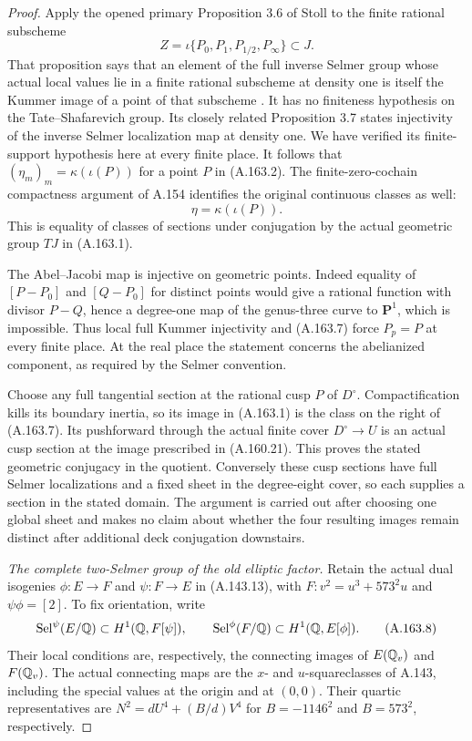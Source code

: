 \begin{proof}
Apply the opened primary Proposition 3.6 of Stoll
to the finite rational subscheme
\[
                  Z=\iota\{P_0,P_1,P_{1/2},P_\infty\}
                         \subset J.
\tag{A.163.6}
\]
That proposition says that an element of the full
inverse Selmer group whose actual local values lie
in a finite rational subscheme at density one is
itself the Kummer image of a point of that subscheme
\cite[Proposition 3.6, p.~9 of the author version]{LegStoll2007}.
It has no finiteness hypothesis on the Tate--Shafarevich
group.  Its closely related Proposition 3.7 states
injectivity of the inverse Selmer localization map
at density one.  We have verified its finite-support
hypothesis here at every finite place.  It follows
that \((\eta_m)_m=\kappa(\iota(P))\) for a point
\(P\) in (A.163.2).  The finite-zero-cochain
compactness argument of A.154 identifies the original
continuous classes as well:
\[
                              \eta=\kappa(\iota(P)).
\tag{A.163.7}
\]
This is equality of classes of sections under
conjugation by the actual geometric group \(TJ\)
in (A.163.1).

The Abel--Jacobi map is injective on geometric
points.  Indeed equality of \([P-P_0]\) and
\([Q-P_0]\) for distinct points would give a
rational function with divisor \(P-Q\), hence a
degree-one map of the genus-three curve to
\(\mathbf P^1\), which is impossible.  Thus local
full Kummer injectivity and (A.163.7) force
\(P_p=P\) at every finite place.  At the real place
the statement concerns the abelianized component,
as required by the Selmer convention.

Choose any full tangential section at the rational
cusp \(P\) of \(D^\circ\).  Compactification
kills its boundary inertia, so its image in
(A.163.1) is the class on the right of (A.163.7).
Its pushforward through the actual finite cover
\(D^\circ\to U\) is an actual cusp section at
the image prescribed in (A.160.21).  This proves
the stated geometric conjugacy in the quotient.
Conversely these cusp sections have full Selmer
localizations and a fixed sheet in the degree-eight
cover, so each supplies a section in the stated
domain.  The argument is carried out after choosing
one global sheet and makes no claim about whether
the four resulting images remain distinct after
additional deck conjugation downstairs.

\emph{The complete two-Selmer group of the old elliptic factor.}
Retain the actual dual isogenies
\(\phi:E\to F\) and \(\psi:F\to E\) in
(A.143.13), with \(F:v^2=u^3+573^2u\) and
\(\psi\phi=[2]\).  To fix orientation, write
\[
 \operatorname{Sel}^{\psi}(E/\mathbb Q)
                       \subset H^1(\mathbb Q,F[\psi]),\qquad
 \operatorname{Sel}^{\phi}(F/\mathbb Q)
                       \subset H^1(\mathbb Q,E[\phi]).
\tag{A.163.8}
\]
Their local conditions are, respectively, the
connecting images of \(E(\mathbb Q_v)\) and \(F(\mathbb Q_v)\).
The actual connecting maps are the \(x\)- and
\(u\)-squareclasses of A.143, including the special
values at the origin and at \((0,0)\).  Their
quartic representatives are
\(N^2=dU^4+(B/d)V^4\) for
\(B=-1146^2\) and \(B=573^2\), respectively.


\end{proof}
